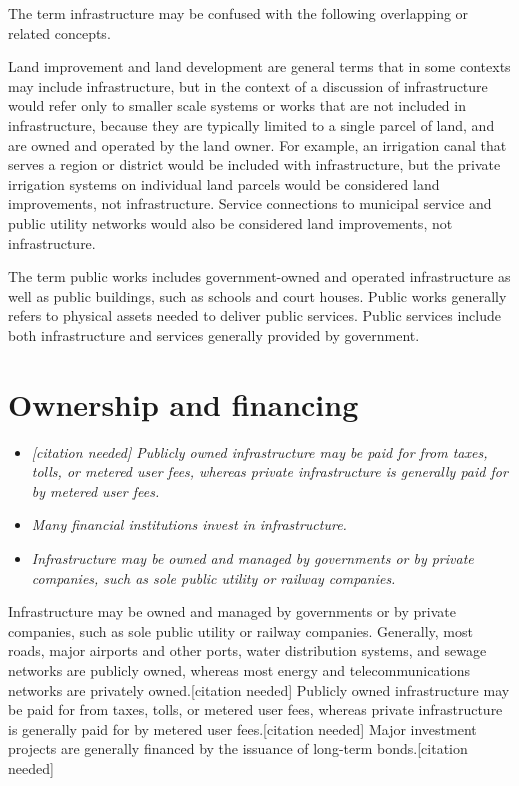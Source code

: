 The term infrastructure may be confused with the following overlapping
or related concepts.

Land improvement and land development are general terms that in some
contexts may include infrastructure, but in the context of a discussion
of infrastructure would refer only to smaller scale systems or works
that are not included in infrastructure, because they are typically
limited to a single parcel of land, and are owned and operated by the
land owner. For example, an irrigation canal that serves a region or
district would be included with infrastructure, but the private
irrigation systems on individual land parcels would be considered land
improvements, not infrastructure. Service connections to municipal
service and public utility networks would also be considered land
improvements, not infrastructure.

The term public works includes government-owned and operated
infrastructure as well as public buildings, such as schools and court
houses. Public works generally refers to physical assets needed to
deliver public services. Public services include both infrastructure and
services generally provided by government.

\section{Ownership and financing}\label{ownership-and-financing}

\begin{itemize}
\item
  \emph{{[}citation needed{]} Publicly owned infrastructure may be paid
  for from taxes, tolls, or metered user fees, whereas private
  infrastructure is generally paid for by metered user fees.}
\item
  \emph{Many financial institutions invest in infrastructure.}
\item
  \emph{Infrastructure may be owned and managed by governments or by
  private companies, such as sole public utility or railway companies.}
\end{itemize}

Infrastructure may be owned and managed by governments or by private
companies, such as sole public utility or railway companies. Generally,
most roads, major airports and other ports, water distribution systems,
and sewage networks are publicly owned, whereas most energy and
telecommunications networks are privately owned.{[}citation needed{]}
Publicly owned infrastructure may be paid for from taxes, tolls, or
metered user fees, whereas private infrastructure is generally paid for
by metered user fees.{[}citation needed{]} Major investment projects are
generally financed by the issuance of long-term bonds.{[}citation
needed{]}

